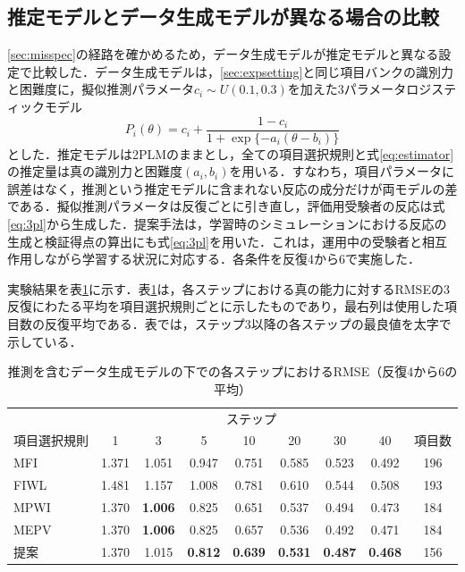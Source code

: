 \documentclass[paper]{ieicej}
\begin{document}
\subsection{推定モデルとデータ生成モデルが異なる場合の比較}\label{sec:misspecexp}

\ref{sec:misspec}の経路を確かめるため，データ生成モデルが推定モデルと異なる設定で比較した．データ生成モデルは，\ref{sec:expsetting}と同じ項目バンクの識別力と困難度に，擬似推測パラメータ$c_i\sim U(0.1,0.3)$を加えた3パラメータロジスティックモデル
\begin{equation}
 P_i(\theta)=c_i+\frac{1-c_i}{1+\exp\{-a_i(\theta-b_i)\}}
 \label{eq:3pl}
\end{equation}
とした．推定モデルは2PLMのままとし，全ての項目選択規則と式\eqref{eq:estimator}の推定量は真の識別力と困難度$(a_i,b_i)$を用いる．すなわち，項目パラメータに誤差はなく，推測という推定モデルに含まれない反応の成分だけが両モデルの差である．擬似推測パラメータは反復ごとに引き直し，評価用受験者の反応は式\eqref{eq:3pl}から生成した．提案手法は，学習時のシミュレーションにおける反応の生成と検証得点の算出にも式\eqref{eq:3pl}を用いた．これは，運用中の受験者と相互作用しながら学習する状況に対応する．各条件を反復4から6で実施した．

実験結果を表\ref{tab:guess}に示す．表\ref{tab:guess}は，各ステップにおける真の能力に対するRMSEの3反復にわたる平均を項目選択規則ごとに示したものであり，最右列は使用した項目数の反復平均である．表では，ステップ3以降の各ステップの最良値を太字で示している．

\begin{table}[t]
\centering
\caption{推測を含むデータ生成モデルの下での各ステップにおけるRMSE（反復4から6の平均）}
\label{tab:guess}
\footnotesize
\setlength{\tabcolsep}{2pt}
\begin{tabular}{lcccccccc}
\hline
 & \multicolumn{7}{c}{ステップ} & \\
項目選択規則 & 1 & 3 & 5 & 10 & 20 & 30 & 40 & 項目数\\
\hline
MFI & 1.371 & 1.051 & 0.947 & 0.751 & 0.585 & 0.523 & 0.492 & 196\\
FIWL & 1.481 & 1.157 & 1.008 & 0.781 & 0.610 & 0.544 & 0.508 & 193\\
MPWI & 1.370 & \textbf{1.006} & 0.825 & 0.651 & 0.537 & 0.494 & 0.473 & 184\\
MEPV & 1.370 & \textbf{1.006} & 0.825 & 0.657 & 0.536 & 0.492 & 0.471 & 184\\
提案 & 1.370 & 1.015 & \textbf{0.812} & \textbf{0.639} & \textbf{0.531} & \textbf{0.487} & \textbf{0.468} & 156\\
\hline
\end{tabular}
\end{table}
\end{document}
